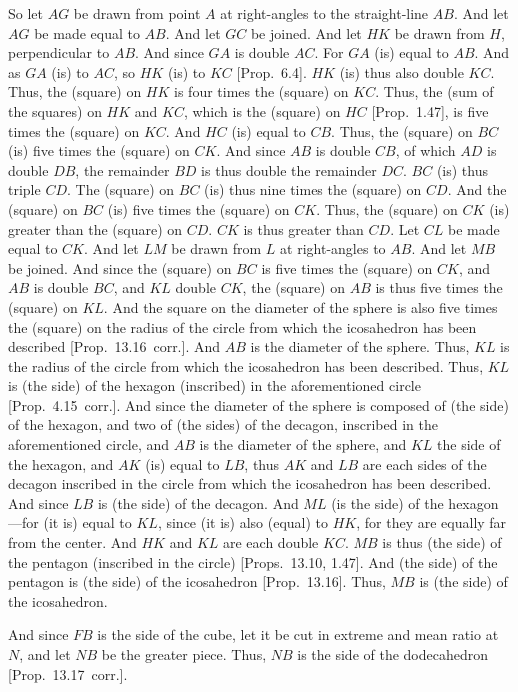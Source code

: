 \begin{Parallel}{}{}
{So let $AG$ be drawn from point $A$ at right-angles to the straight-line
$AB$. And let $AG$ be made equal to $AB$. And let $GC$
be joined. And let $HK$ be drawn from $H$, perpendicular to $AB$. And since $GA$ is double $AC$. 
For $GA$ (is) equal to $AB$.  And as $GA$ (is) to $AC$, so
$HK$ (is) to $KC$ [Prop.~6.4]. $HK$ (is) thus also double
$KC$. Thus, the (square) on $HK$ is four times the (square)
on $KC$. Thus, the (sum of the squares) on $HK$ and $KC$,
which is the (square) on $HC$ [Prop.~1.47],  is five times the
(square) on $KC$.  And $HC$ (is) equal to $CB$. Thus,
the (square) on $BC$ (is) five times the (square) on  $CK$. 
And since $AB$ is double $CB$, of which $AD$ is double $DB$, 
the remainder $BD$ is thus double the remainder $DC$.
$BC$ (is) thus triple $CD$. The (square) on $BC$ (is) thus nine times 
the (square) on $CD$.  And the (square) on $BC$ (is) five times the (square)
on $CK$.  Thus, the (square) on $CK$ (is) greater than the (square) on $CD$.
$CK$ is thus greater than $CD$. Let $CL$ be made equal to $CK$.
And let $LM$ be drawn from $L$ at right-angles to $AB$. 
And let $MB$ be joined. And since the (square) on  $BC$
is five times the (square) on $CK$, and $AB$ is double $BC$, and $KL$
double $CK$, the (square) on $AB$ is thus five times the (square)
on $KL$. And the square on the diameter of the sphere  is also five times
the (square) on the radius of the circle from which the icosahedron has been
described [Prop.~13.16~corr.]. And $AB$ is the diameter of the sphere.
Thus, $KL$ is the radius of the circle from which the icosahedron has
been described. Thus, $KL$ is (the side) of the hexagon (inscribed) in the aforementioned
circle [Prop.~4.15~corr.]. And since the diameter of the sphere is composed of (the side) of the hexagon, and two of (the sides) of the decagon, inscribed
in the aforementioned circle, and $AB$ is the diameter of the sphere, 
and $KL$ the side of the hexagon, and $AK$ (is) equal to $LB$, thus
$AK$ and $LB$ are each sides of the decagon inscribed in the  circle
from which the icosahedron has been described. And since
$LB$ is (the side) of the decagon. And $ML$ (is the side) of the hexagon---for (it is) equal to $KL$, since (it is) also (equal) to $HK$, for they are equally
far from the center. And $HK$ and $KL$ are each double $KC$. 
$MB$ is thus (the side) of the pentagon (inscribed in the circle) [Props.~13.10, 1.47]. 
And (the side) of the pentagon is (the side) of the icosahedron [Prop.~13.16]. 
Thus, $MB$ is (the side) of the icosahedron. 

And since $FB$ is the side of the cube, let it be cut in extreme and
mean ratio at $N$, and let $NB$ be the greater piece. Thus, $NB$
is the side of the dodecahedron [Prop.~13.17~corr.].

}
\end{Parallel}
